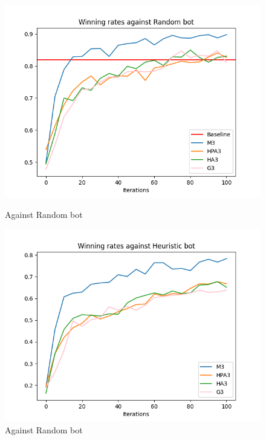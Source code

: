 \documentclass[runningheads]{llncs}
\begin{document}
    \begin{figure}[htbp]
    \centering
    \begin{minipage}[t]{0.48\textwidth}
        \centering
        \includegraphics[width=\linewidth]{Winning_rates_against_random.png}
        \caption{Against Random bot}
        \label{fig:random}
    \end{minipage}
    \begin{minipage}[t]{0.48\textwidth}
        \centering
        \includegraphics[width=\linewidth]{Winning_rates_against_heuristic.png}
        \caption{Against Random bot}
        \label{fig:heuristic}
    \end{minipage}
    \end{figure}
    
\end{document}
